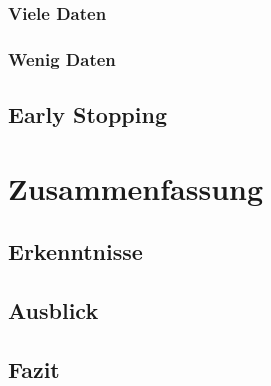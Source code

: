 \documentclass[ngerman]{report}
\begin{document}
    \subsection{Viele Daten}
    
    \subsection{Wenig Daten}
    
    \section{Early Stopping}
    
    
    \chapter{Zusammenfassung}  %
    \section{Erkenntnisse}
    
    \section{Ausblick}
    
    \section{Fazit}
    

    \listoffigures
    \listoftables
    \printbibliography
\end{document}
